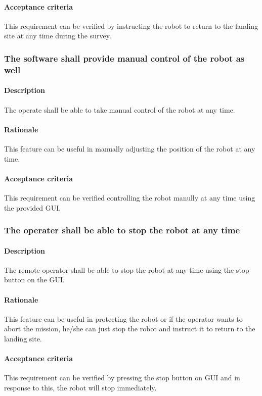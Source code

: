 \documentclass[10pt,a4paper,titlepage]{article}
\begin{document}
    \paragraph{Acceptance criteria}   This requirement can be verified by instructing the robot to return to the landing site at any time during the survey.
    \subsubsection{The software shall provide manual control of the robot as well}
     \paragraph{Description}   The operate shall be able to take manual control of the robot at any time. 
    \paragraph{Rationale}   This feature can be useful in manually adjusting the position of the robot at any time.
    \paragraph{Acceptance criteria}   This requirement can be verified controlling the robot manully at any time using the provided GUI.
    \subsubsection{The operater shall be able to stop the robot at any time}
     \paragraph{Description}   The remote operator shall be able to stop the robot at any time using the stop button on the GUI. 
    \paragraph{Rationale}   This feature can be useful in protecting the robot or if the operator wants to abort the mission, he/she can just stop the robot and instruct it to return to the landing site.
    \paragraph{Acceptance criteria}   This requirement can be verified by pressing the stop button on GUI and in response to this, the robot will stop immediately. 
\end{document}
